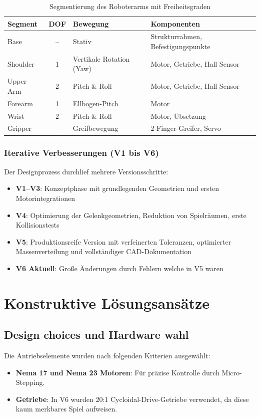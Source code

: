 \begin{table}[h]
	\centering
	\begin{tabular}{|l|c|l|p{5cm}|}
		\hline
		\textbf{Segment} & \textbf{DOF} & \textbf{Bewegung} & \textbf{Komponenten} \\
		\hline
		Base & -- & Stativ & Strukturrahmen, Befestigungspunkte \\
		\hline
		Shoulder & 1 & Vertikale Rotation (Yaw) & Motor, Getriebe, Hall Sensor \\
		\hline
		Upper Arm & 2 & Pitch \& Roll &  Motor, Getriebe, Hall Sensor \\
		\hline
		Forearm & 1 & Ellbogen-Pitch & Motor \\
		\hline
		Wrist & 2 & Pitch \& Roll & Motor, Übsetzung \\
		\hline
		Gripper & -- & Greifbewegung & 2-Finger-Greifer, Servo \\
		\hline
	\end{tabular}
	\caption{Segmentierung des Roboterarms mit Freiheitsgraden}
	\label{tab:segments}
\end{table}

\subsubsection{Iterative Verbesserungen (V1 bis V6)}

Der Designprozess durchlief mehrere Versionsschritte:

\begin{itemize}
	\item \textbf{V1--V3}: Konzeptphase mit grundlegenden Geometrien und ersten Motorintegrationen
	\item \textbf{V4}: Optimierung der Gelenkgeometrien, Reduktion von Spielräumen, erste Kollisionstests
	\item \textbf{V5}: Produktionsreife Version mit verfeinerten Toleranzen, optimierter Massenverteilung und vollständiger CAD-Dokumentation
	\item \textbf{V6 Aktuell}: Große Änderungen durch Fehlern welche in V5 waren
\end{itemize}

\section{Konstruktive Lösungsansätze}

\subsection{Design choices und Hardware wahl}
Die Antriebselemente wurden nach folgenden Kriterien ausgewählt:
\begin{itemize}
	\item \textbf{Nema 17 und Nema 23 Motoren}: Für präzise Kontrolle durch Micro-Stepping.
	\item \textbf{Getriebe}: In V6 wurden 20:1 Cycloidal-Drive-Getriebe verwendet, da diese kaum merkbares Spiel aufweisen.
\end{itemize}

